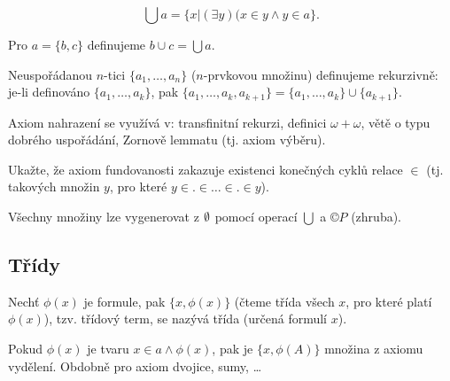 \documentclass[12pt]{article}                   %
\begin{document}
    \begin{definice}[Značení]
        $$ \bigcup a = \{x | (\exists y)(x \in y \land y \in a\}. $$ 
        
        \begin{definicein}
            Pro $a = \{b, c\}$ definujeme $b \cup c = \bigcup a$.
        \end{definicein}
    \end{definice}

    \begin{definice}
            Neuspořádanou $n$-tici $\{a_1, …, a_n\}$ ($n$-prvkovou množinu) definujeme rekurzivně: je-li definováno $\{a_1, …, a_k\}$, pak $\{a_1, …, a_k, a_{k+1}\} = \{a_1, …, a_k\} \cup \{a_{k+1}\}$.
    \end{definice}


    \begin{poznamka}
        Axiom nahrazení se využívá v: transfinitní rekurzi, definici $\omega + \omega$, větě o typu dobrého uspořádání, Zornově lemmatu (tj. axiom výběru).
    \end{poznamka}

    \begin{priklad}
        Ukažte, že axiom fundovanosti zakazuje existenci konečných cyklů relace $\in$ (tj. takových množin $y$, pro které $y \in . \in … \in . \in y$).

        \begin{dusledekin}
            Všechny množiny lze vygenerovat z $\emptyset$ pomocí operací $\bigcup$ a $©P$ (zhruba).
        \end{dusledekin}
    \end{priklad}

    \subsection{Třídy}
        \begin{definice}
            Nechť $\phi(x)$ je formule, pak $\{x, \phi(x)\}$ (čteme třída všech $x$, pro které platí $\phi(x)$), tzv. třídový term, se nazývá třída (určená formulí $x$).
        \end{definice}

        \begin{dusledek}
            Pokud $\phi(x)$ je tvaru $x \in a \land \phi(x)$, pak je $\{x, \phi(A)\}$ množina z axiomu vydělení. Obdobně pro axiom dvojice, sumy, …
        \end{dusledek}
\end{document}
